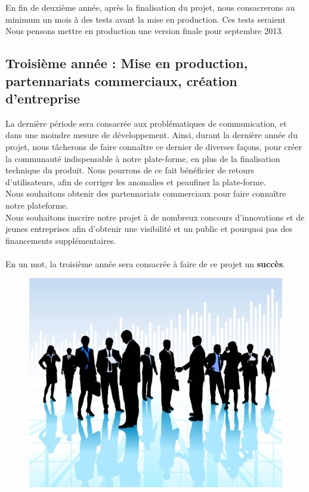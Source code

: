 \documentclass{life-fr}
\begin{document}
En fin de deuxième année, après la finalisation du projet, nous consacrerons au minimum un mois à des tests avant la mise en production. Ces tests seraient \\
Nous pensons mettre en production une version finale pour septembre 2013.\\

\subsection{ Troisième année : Mise en production, partennariats commerciaux, création d'entreprise}

La dernière période sera consacrée aux problématiques de communication, et dans une moindre mesure de développement. Ainsi, durant la dernière année du projet, nous tâcherons de faire connaître ce dernier de diverses façons, pour créer la communauté indispensable à notre plate-forme, en plus de la finalisation technique du produit. Nous pourrons de ce fait bénéficier de retours d'utilisateurs, afin de corriger les anomalies et peaufiner la plate-forme.\\
Nous souhaitons obtenir des partennariats commerciaux pour faire connaître notre plateforme.\\
Nous souhaitons inscrire notre projet à de nombreux concours d'innovations et de jeunes entreprises afin d'obtenir une visibilité et un public et pourquoi pas des financements supplémentaires.\\
\\
En un mot, la troisième année sera consacrée à faire de ce projet un \textbf{succès}.

\begin{figure}[H]
  \begin{center}
    \includegraphics[width=12cm]{img/corporate.jpg}
  \end{center}
\end{figure}
\end{document}

